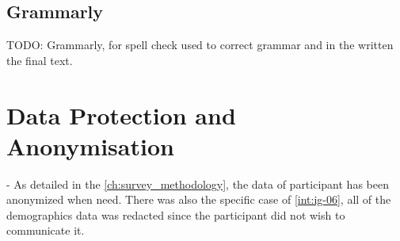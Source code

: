 

\subsection{Grammarly}\autocite{grammarly_2026}
TODO: Grammarly, for spell check used to correct grammar and  in the written the final text.

\section{Data Protection and Anonymisation}
- As detailed in the \ref{ch:survey_methodology}, the data of participant has been anonymized when need.
There was also the specific case of \ref{int:ig-06}, all of the demographics data was redacted since the participant did not wish to communicate it.